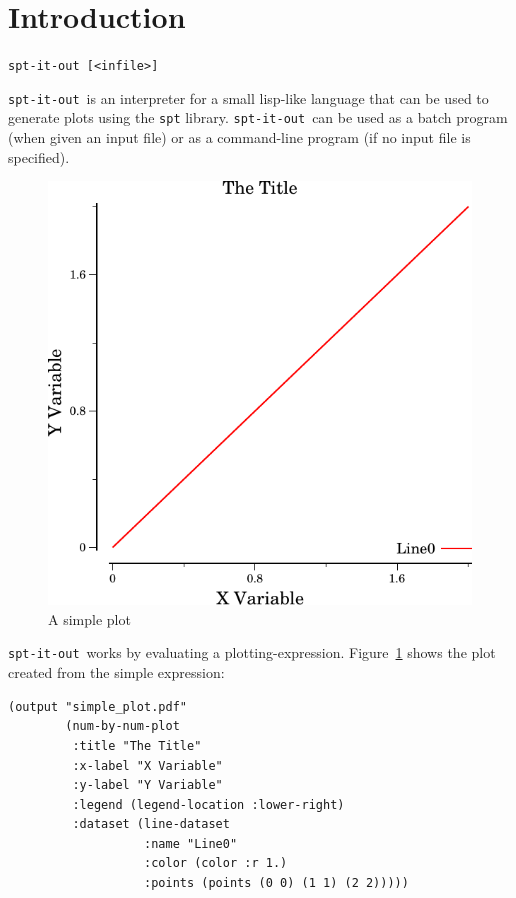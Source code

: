 \documentclass{article}
\title{\sio}
\author{Ethan Burns\\
{\tt burns.ethan at gmail.com}}
\date{\today}
\newcommand{\sio}{{\tt spt-it-out}}
\begin{document}
\maketitle

\section{Introduction}
\begin{center}
{\tt spt-it-out [<infile>]}
\end{center}

\sio\ is an interpreter for a small lisp-like language that can be
used to generate plots using the {\tt spt} library.  \sio\ can be used
as a batch program (when given an input file) or as a command-line
program (if no input file is specified).

\begin{figure}[t]
\begin{center}
\includegraphics{simple_plot}
\caption{\label{fig:simp}A simple plot}
\end{center}
\end{figure}

\sio\ works by evaluating a plotting-expression.
Figure~\ref{fig:simp} shows the plot created from the simple
expression:

\begin{verbatim}
(output "simple_plot.pdf"
        (num-by-num-plot
         :title "The Title"
         :x-label "X Variable"
         :y-label "Y Variable"
         :legend (legend-location :lower-right)
         :dataset (line-dataset
                   :name "Line0"
                   :color (color :r 1.)
                   :points (points (0 0) (1 1) (2 2)))))
\end{verbatim}
\end{document}
